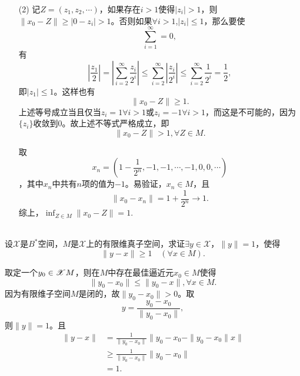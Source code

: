 \begin{exercise}
\begin{enumerate}
\item[(2)] 记$Z=(z_1,z_2,\cdots)$，如果存在$i>1$使得$|z_i|>1$，则$\|x_0-Z\|\geq|0-z_i|>1$。否则如果$\forall i>1$,$|z_i|\leq1$，那么要使
$$\sum_{i=1}^{\infty}=0,$$
有$$|\frac{z_1}{2}|=|\sum_{i=2}^{\infty}\frac{z_i}{2^i}|\leq\sum_{i=2}^{\infty}|\frac{z_i}{2^i}|\leq\sum_{i=2}^{\infty}\frac{1}{2^i}=\frac{1}{2},$$即$|z_1|\leq1$。这样也有
$$\|x_0-Z\|\geq1.$$
上述等号成立当且仅当$z_i=1\forall i>1$或$z_i=-1\forall i>1$，而这是不可能的，因为$\{z_i\}$收敛到$0$。故上述不等式严格成立，即$$\|x_0-Z\|>1,\forall Z\in M.$$

取$$x_n=(1-\frac{1}{2^n},-1,-1,\cdots,-1,0,0,\cdots)$$，其中$x_n$中共有$n$项的值为$-1$。易验证，$x_n\in M$，且
$$\|x_0-x_n\|=1+\frac{1}{2^n}\to1.$$
综上，$\inf_{Z\in M}\|x_0-Z\|=1.$
\end{enumerate}
\end{exercise}

\begin{exercise}
\hfill\\
设$\mathscr{X}$是$B^*$空间，$M$是$\mathscr{X}$上的有限维真子空间，求证$\exists y\in\mathscr{X}$，$\|y\|=1$，使得
$$\|y-x\|\geq1\quad(\forall x\in M).$$

取定一个$y_0\in\mathscr{X}\\M$，则在$M$中存在最佳逼近元$x_0\in M$使得$$\|y_0-x_0\|\leq\|y_0-x\|,\forall x\in M.$$因为有限维子空间$M$是闭的，故$\|y_0-x_0\|>0$。取
$$y=\frac{y_0-x_0}{\|y_0-x_0\|},$$
则$\|y\|=1$。且
\begin{align*}
\|y-x\|&=\frac{1}{\|y_0-x_0\|}\|y_0-x_0-\|y_0-x_0\|x\|\\
&\geq\frac{1}{\|y_0-x_0\|}\|y_0-x_0\|\\
&=1.
\end{align*}
\end{exercise}
\hfill\\
